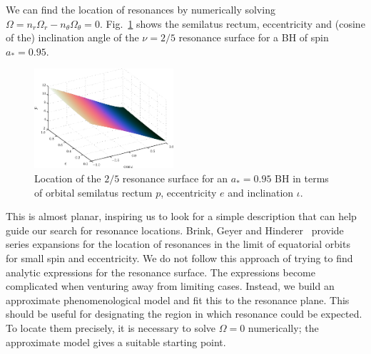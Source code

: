\documentclass[aps,prd,amsfonts,amssymb,amsmath,nofootinbib,showpacs,superscriptaddress,twocolumn]{revtex4}
\newcommand{\Figref}[1]{Fig.~\ref{fig:#1}}
\begin{document}
We can find the location of resonances by numerically solving $\Omega = n_r \Omega_r - n_\theta \Omega_\theta = 0$. \Figref{res-plane-2-5-95} shows the semilatus rectum, eccentricity and (cosine of the) inclination angle of the $\nu = 2/5$ resonance surface for a BH of spin $a_\ast = 0.95$. 
\begin{figure}
\centering
\includegraphics[width=0.46\textwidth]{Fig_res-2-5-95-plane}
\caption{\label{fig:res-plane-2-5-95}Location of the $2/5$ resonance surface for an $a_\ast = 0.95$ BH in terms of orbital semilatus rectum $p$, eccentricity $e$ and inclination $\iota$.}
\end{figure}
This is almost planar, inspiring us to look for a simple description that can help guide our search for resonance locations. Brink, Geyer and Hinderer~\cite{Brink2013} provide series expansions for the location of resonances in the limit of equatorial orbits for small spin and eccentricity. We do not follow this approach of trying to find analytic expressions for the resonance surface. The expressions become complicated when venturing away from limiting cases. Instead, we build an approximate phenomenological model and fit this to the resonance plane. %
This should be useful for designating the region in which resonance could be expected. To locate them precisely, it is necessary to solve $\Omega = 0$ numerically; the approximate model gives a suitable starting point.
\end{document}
